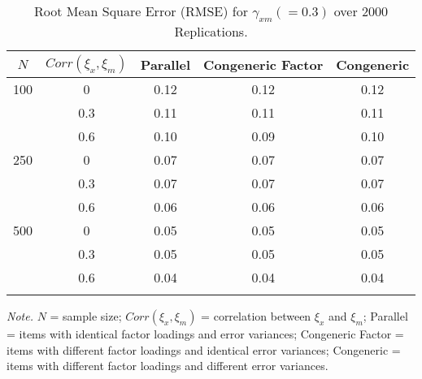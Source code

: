 \documentclass[
  man]{apa6}
\begin{document}
\begin{table}[tbp]

\begin{center}
\begin{threeparttable}

\caption{\label{tab:rmse}Root Mean Square Error (RMSE) for $\gamma_{xm} (= 0.3)$ over 2000 Replications.}

\begin{tabular}{ccccc}
\toprule
$\textit{N}$ & \multicolumn{1}{c}{$Corr(\xi_{x}, \xi_{m})$} & \multicolumn{1}{c}{Parallel} & \multicolumn{1}{c}{Congeneric Factor} & \multicolumn{1}{c}{Congeneric}\\
\midrule
100 & 0 & 0.12 & 0.12 & 0.12\\
 & 0.3 & 0.11 & 0.11 & 0.11\\
 & 0.6 & 0.10 & 0.09 & 0.10\\
250 & 0 & 0.07 & 0.07 & 0.07\\
 & 0.3 & 0.07 & 0.07 & 0.07\\
 & 0.6 & 0.06 & 0.06 & 0.06\\
500 & 0 & 0.05 & 0.05 & 0.05\\
 & 0.3 & 0.05 & 0.05 & 0.05\\
 & 0.6 & 0.04 & 0.04 & 0.04\\
\bottomrule
\addlinespace
\end{tabular}

\begin{tablenotes}[para]
\normalsize{\textit{Note.} $\textit{N}$ = sample size; $Corr(\xi_{x}, \xi_{m})$ = correlation between $\xi_{x}$ and $\xi_{m}$; Parallel = items with identical factor loadings and error variances; Congeneric Factor = items with different factor loadings and identical error variances; Congeneric = items with different factor loadings and different error variances.}
\end{tablenotes}

\end{threeparttable}
\end{center}

\end{table}
\end{document}
